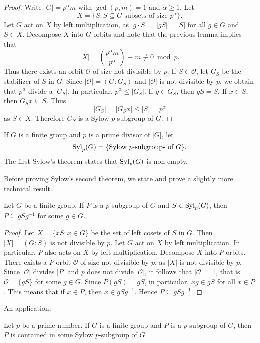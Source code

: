 \begin{proof}
Write $|G|=p^\alpha m$ with $\gcd(p,m)=1$ and $\alpha\geq1$. Let 
\[
X=\{S:S\subseteq G\text{ subsets of size $p^\alpha$}\}.
\]
Let $G$ act on $X$ by left multiplication, as $|g\cdot S|=|gS|=|S|$ for all $g\in G$ and $S\in X$. Decompose $X$
into $G$-orbits and note that the previous lemma
implies that 
\[
|X|= \binom{p^\alpha m}{p^\alpha}\equiv m\not\equiv 0\bmod p.
\]
Thus there exists an orbit $\mathcal{O}$ of size not divisible by $p$. 
If $S\in\mathcal{O}$, let $G_S$ be the stabilizer of $S$ in $G$. Since
$|\mathcal{O}|=(G:G_S)$ and $|\mathcal{O}|$ is not divisible by $p$, we obtain that $p^\alpha$ divide a $|
G_S|$. In particular, $p^\alpha\leq |G_S|$. If $g\in G_S$, then
$gS=S$. If $x\in S$, then $G_Sx\subseteq S$. Thus 
\[
|G_S|=|G_Sx|\leq |S|=p^\alpha
\]
as $S\in X$. Therefore $G_S$ is a Sylow $p$-subgroup of $G$.
\end{proof}

If $G$ is a finite group and
$p$ is a prime divisor of $|G|$, 
let 
\[
\mathrm{Syl}_p(G)=\{\text{Sylow $p$-subgroups of $G$}\}.
\]
The first Sylow's theorem states that 
$\mathrm{Syl}_p(G)$ is non-empty. 

Before proving Sylow's second theorem, 
we state and prove a slightly more technical result. 

\begin{theorem}
\label{thm:Sylow_auxiliar}
Let $G$ be a finite group. 
If $P$ is a $p$-subgroup of $G$ and $S\in\mathrm{Syl}_p(G)$, then $P\subseteq gSg^{-1}$ for some $g\in G$.
\end{theorem}

\begin{proof}
    Let $X=\{xS:x\in G\}$ be the set of left cosets of $S$ in $G$. Then $|X|=(G:S)$ is not divisible by $p$. Let $G$ act on $X$ 
    by left multiplication. In particular, 
    $P$ also acts on $X$ by left multiplication. 
    Decompose $X$ into 
    $P$-orbits. There exists a $P$-orbit $\mathcal{O}$ of size
    not divisible by $p$, as $|X|$ is not divisible by $p$. Since  $|\mathcal{O}|$ divides $|P|$ and $p$ does not divide 
    $|\mathcal{O}|$, it follows that $|\mathcal{O}|=1$,
    that is $\mathcal{O}=\{gS\}$ for some
    $g\in G$. Since $P(gS)=gS$, in particular, $xg\in gS$ 
    for all $x\in P$. This means that if $x\in P$, then 
    $x\in gSg^{-1}$. Hence $P\subseteq gSg^{-1}$.
\end{proof}

An application:

\begin{corollary}
    Let $p$ be a prime number. 
    If $G$ is a finite group and 
    $P$ is a $p$-subgroup of $G$, then $P$ 
    is contained in some Sylow $p$-subgroup of $G$.
\end{corollary}

